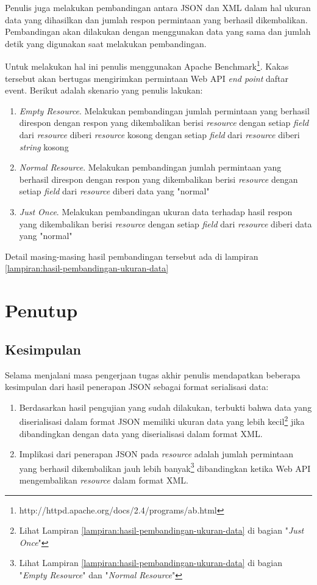 \documentclass[a4paper, 12pt, oneside]{report}
\begin{document}
Penulis juga melakukan pembandingan antara JSON dan XML dalam hal ukuran data yang dihasilkan dan jumlah respon permintaan yang berhasil dikembalikan. Pembandingan akan dilakukan dengan menggunakan data yang sama dan jumlah detik yang digunakan saat melakukan pembandingan.

Untuk melakukan hal ini penulis menggunakan Apache Benchmark\footnote{http://httpd.apache.org/docs/2.4/programs/ab.html}. Kakas tersebut akan bertugas mengirimkan permintaan Web API \textit{end point} daftar event. Berikut adalah skenario yang penulis lakukan:

\begin{enumerate}
  \item \textit{Empty Resource}. Melakukan pembandingan jumlah permintaan yang berhasil direspon dengan respon yang dikembalikan berisi \textit{resource} dengan setiap \textit{field} dari \textit{resource} diberi \textit{resource} kosong dengan setiap \textit{field} dari \textit{resource} diberi \textit{string} kosong
  \item \textit{Normal Resource}. Melakukan pembandingan jumlah permintaan yang berhasil direspon dengan respon yang dikembalikan berisi \textit{resource} dengan setiap \textit{field} dari \textit{resource} diberi data yang "normal"
  \item \textit{Just Once}. Melakukan pembandingan ukuran data terhadap hasil respon yang dikembalikan berisi \textit{resource} dengan setiap \textit{field} dari \textit{resource} diberi data yang "normal"
\end{enumerate}

Detail masing-masing hasil pembandingan tersebut ada di lampiran \ref{lampiran:hasil-pembandingan-ukuran-data}

\chapter{Penutup}

\section{Kesimpulan}

Selama menjalani masa pengerjaan tugas akhir penulis mendapatkan beberapa kesimpulan dari hasil penerapan JSON sebagai format serialisasi data:

\begin{enumerate}
  \item Berdasarkan hasil pengujian yang sudah dilakukan, terbukti bahwa data yang diserialisasi dalam format JSON memiliki ukuran data yang lebih kecil\footnote{Lihat Lampiran \ref{lampiran:hasil-pembandingan-ukuran-data} di bagian "\textit{Just Once}"} jika dibandingkan dengan data yang diserialisasi dalam format XML.
  \item Implikasi dari penerapan JSON pada \textit{resource} adalah jumlah permintaan yang berhasil dikembalikan jauh lebih banyak\footnote{Lihat Lampiran \ref{lampiran:hasil-pembandingan-ukuran-data} di bagian "\textit{Empty Resource}" dan "\textit{Normal Resource}"} dibandingkan ketika Web API mengembalikan \textit{resource} dalam format XML.
\end{enumerate}
\end{document}
